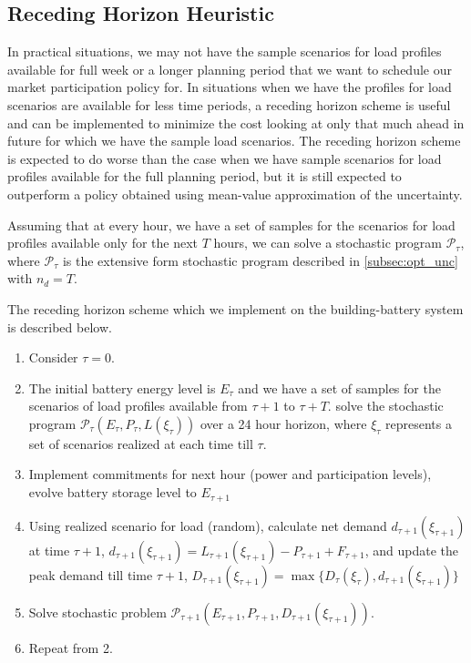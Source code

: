 \documentclass[11pt,twoside]{article}
\begin{document}
\FloatBarrier
\subsection{Receding Horizon Heuristic}
In practical situations, we may not have the sample scenarios for load profiles available for full week or a longer planning period that we want to schedule our market participation policy for. In situations when we have the profiles for load scenarios are available for less time periods, a receding horizon scheme is useful and can be implemented to minimize the cost looking at only that much ahead in future for which we have the sample load scenarios. The receding horizon scheme is expected to do worse than the case when we have sample scenarios for load profiles available for the full planning period, but it is still expected to outperform a policy obtained using mean-value approximation of the uncertainty.

Assuming that at every hour, we have a set of samples for the scenarios for load profiles available only for the next $T$ hours, we can solve a stochastic program $\mathcal{P}_{\tau}$, where $\mathcal{P}_{\tau}$ is the extensive form stochastic program described in \ref{subsec:opt_unc} with $n_d = T$.

The receding horizon scheme which we implement on the building-battery system is described below.
\begin{enumerate}
\item Consider $\tau = 0$.
\item The initial battery energy level is $E_\tau$ and we have a set of samples for the scenarios of load profiles available from $\tau+1$ to $\tau+T$. solve the stochastic program $\mathcal{P}_{\tau}\left(E_{\tau},P_{\tau},L(\xi_{\tau})\right)$ over a 24 hour horizon, where $\xi_\tau$ represents a set of scenarios realized at each time till $\tau$. 
\item Implement commitments for next hour (power and participation levels), evolve battery storage level to $E_{\tau+1}$
\item Using realized scenario for load (random), calculate net demand $d_{\tau+1}(\xi_{\tau+1})$ at time $\tau+1$, $d_{\tau+1}(\xi_{\tau+1}) = L_{\tau+1}(\xi_{\tau+1}) - P_{\tau+1} + F_{\tau+1}$, and update the peak demand till time $\tau+1$, $D_{\tau+1}(\xi_{\tau+1}) = \max\{D_{\tau}(\xi_{\tau}),d_{\tau+1}(\xi_{\tau+1})\}$             
\item Solve stochastic problem $\mathcal{P}_{\tau+1}\left(E_{\tau+1},P_{\tau+1},D_{\tau+1}(\xi_{\tau+1})\right)$. \item Repeat from 2.
\end{enumerate}
\end{document}
